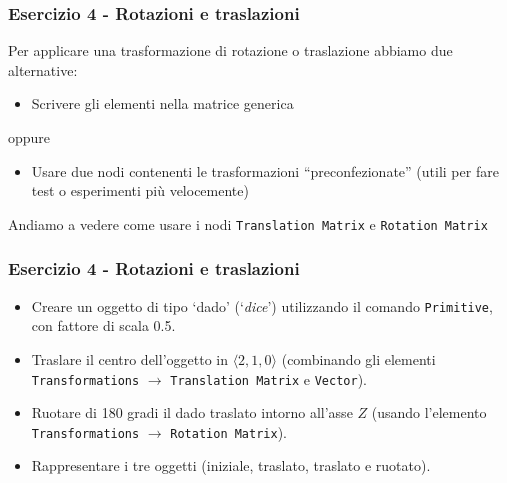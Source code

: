 \documentclass{beamer}
\begin{document}
\begin{frame}
\frametitle {Esercizio 4 - Rotazioni e traslazioni}
Per applicare una trasformazione di rotazione o traslazione abbiamo due alternative:
\begin{itemize}
    \item Scrivere gli elementi nella matrice generica
\end{itemize}
    \begin{center}
    oppure
    \end{center}
\begin{itemize}
\item Usare due nodi contenenti le trasformazioni ``preconfezionate'' (utili per fare test o esperimenti pi\`u velocemente)
\end{itemize}
    \vspace{0.5 cm}
Andiamo a vedere come usare i nodi \texttt{Translation Matrix} e \texttt{Rotation Matrix}
\end{frame}


\begin{frame}
\frametitle {Esercizio 4 - Rotazioni e traslazioni}
\begin{itemize}
    \item Creare un oggetto di tipo `dado' (`\textit{dice}') utilizzando il comando \texttt{Primitive}, con fattore di scala 0.5.
\item Traslare il centro dell'oggetto in $\langle 2,1,0\rangle$  (combinando gli elementi \texttt{Transformations} $\rightarrow$ \texttt{Translation Matrix} e \texttt{Vector}).  
\item Ruotare di 180 gradi il dado traslato intorno all'asse $Z$ (usando l'elemento \texttt{Transformations} $\rightarrow$ \texttt{Rotation Matrix}).  
\item Rappresentare i tre oggetti (iniziale, traslato, traslato e ruotato).
\end{itemize}
\end{frame}
\end{document}
